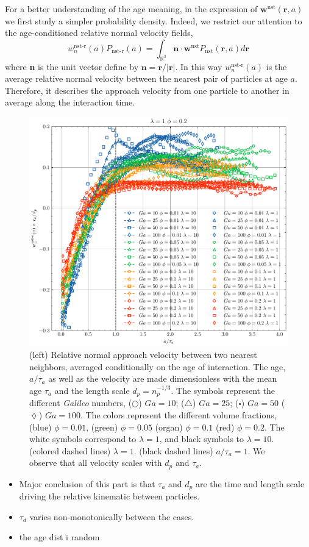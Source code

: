 For a better understanding of the age meaning, in the expression of $\textbf{w}^\text{nst}(\textbf{r},a)$ we first study a simpler probability density. 
Indeed, we restrict our attention to the age-conditioned relative normal velocity fields, 
\begin{equation*}
    w^\text{nst-r}_n(a)P_\text{nst-r}(a)
    = \int_{\mathbb{R}^3}
    \textbf{n} \cdot \textbf{w}^\text{nst}
    P_\text{nst}(\textbf{r},a) d\textbf{r}
\end{equation*}
where \textbf{n} is the unit vector define by $\textbf{n} = \textbf{r}/ |\textbf{r}|$. 
In this way $w^\text{nst-r}_n(a)$ is the average relative normal velocity between the nearest pair of particles at age $a$. 
Therefore, it describes the approach velocity from one particle to another in average along the interaction time. 
\begin{figure}[h!]
    \centering
    \includegraphics[height = 0.8\textwidth]{image/HOMOGENEOUS_NEW/Age_cond/uR_rel.pdf}
    \caption{(left) Relative normal approach velocity between two nearest neighbors, averaged conditionally on the age of interaction.  
    The age, $a/\tau_a$ as well as the velocity are made dimensionless  with the mean age $\tau_a$ and the length scale $d_p = n_p^{-1/3}$. 
    The symbols represent the different \textit{Galileo} numbers,
    ($\bigcirc$) $Ga=10$; ($\triangle$) $ Ga = 25$; ($\square$) $Ga = 50$ ($\lozenge$) $Ga =100$.
    The colors represent the different volume fractions, (blue) $\phi =0.01$, (green) $\phi = 0.05$ (organ) $\phi=0.1$ (red) $\phi = 0.2$. 
    The white symbols correspond to $\lambda = 1$, and black symbols to $\lambda = 10$. 
    (colored dashed lines) $\lambda = 1$. 
    (black dashed lines) $a/\tau_a =1$. 
    We observe that all velocity scales with $d_p$ and $\tau_a$. 
    }
    \label{fig:normal_vel_picture}
\end{figure}

\begin{itemize}
    \item Major conclusion of this part is that $\tau_a$ and $d_p$ are the time and length scale driving the relative kinematic between particles. 
    \item $\tau_d$ varies non-monotonically between the cases. 
    \item the age dist i random
\end{itemize}
